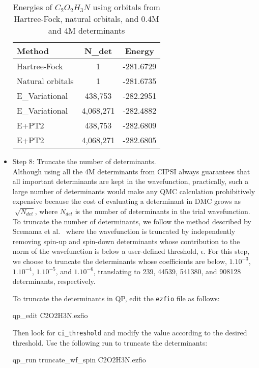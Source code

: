 \begin{itemize}
\begin{table}[t]
\centering
\caption{Energies of $C_2O_2H_3N$ using orbitals from Hartree-Fock, natural orbitals, and 0.4M and 4M determinants}
\label{TAB:CIPSI}
\begin{tabular}{l|c|c}
\hline \hline
Method & N\_det & Energy\\
\hline
Hartree-Fock &    1    & -281.6729\\
Natural orbitals & 1 & -281.6735\\
E\_Variational &  438,753 & -282.2951 \\
E\_Variational &  4,068,271   & -282.4882 \\
E+PT2 & 438,753& -282.6809 \\
E+PT2 & 4,068,271 & -282.6805  \\ \hline \hline
\end{tabular}
\end{table}

\item Step 8: Truncate the number of determinants.\\ Although using
  all the 4M determinants from CIPSI always guarantees that all
  important determinants are kept in the wavefunction, practically,
  such a large number of determinants would make any QMC calculation
  prohibitively expensive because the cost of evaluating a determinant in
  DMC grows as $\sqrt[]{N_{det}}$, where $N_{det}$ is the number of
  determinants in the trial wavefunction. To truncate the number of
  determinants, we follow the method described by Scemama
 et al.~\cite{Scemama2018} where the wavefunction is
  truncated by independently removing spin-up and spin-down
  determinants whose contribution to the norm of the wavefunction is
  below a user-defined threshold, $\epsilon$. For this step, we choose
  to truncate the determinants whose coefficients are below,
  $1.10^{-3}$, $1.10^{-4}$, $1.10^{-5}$, and $1.10^{-6}$, translating
  to 239, 44539, 541380, and 908128 determinants, respectively.

To  truncate the determinants in QP, edit the \texttt{ezfio} file as follows:

\begin{shade}
qp_edit C2O2H3N.ezfio  
\end{shade}

Then look for \texttt{ci\_threshold} and modify the value according to the desired threshold. Use the following run to truncate the determinants:

\begin{shade}
qp_run truncate_wf_spin C2O2H3N.ezfio  
\end{shade}


\end{itemize}
